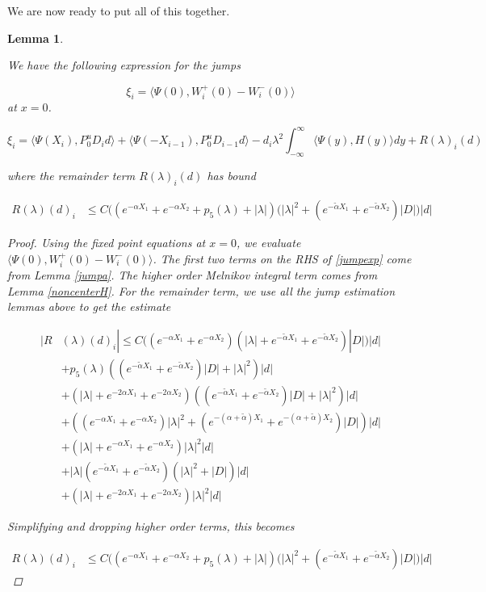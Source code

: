 \documentclass[12pt]{article}
\newtheorem{lemma}{Lemma}
\begin{document}
We are now ready to put all of this together.


\begin{lemma}\label{jump}

We have the following expression for the jumps 

\[
\xi_i = \langle \Psi(0), W_i^+(0) - W_i^-(0) \rangle
\]
at $x = 0$.

\begin{equation}\label{jumpexp}
\xi_i = \langle \Psi(X_i), P^u_0 D_i d \rangle + \langle \Psi(-X_{i-1}), P^u_0 D_{i-1} d \rangle - d_i \lambda^2 \int_{-\infty}^\infty \langle \Psi(y), H(y) \rangle dy + R(\lambda)_i(d)
\end{equation}

where the remainder term $R(\lambda)_i(d)$ has bound

\begin{align*}
R(\lambda)(d)_i &\leq C \Big( ( e^{-\alpha X_1} + e^{-\alpha X_2} + p_5(\lambda) + |\lambda| )(|\lambda|^2 + (e^{-\tilde{\alpha}X_1} + e^{-\tilde{\alpha}X_2}) |D|\Big) |d|
\end{align*}

\begin{proof}
Using the fixed point equations at $x = 0$, we evaluate $\langle \Psi(0), W_i^+(0) - W_i^-(0) \rangle$. The first two terms on the RHS of \eqref{jumpexp} come from Lemma \ref{jumpa}. The higher order Melnikov integral term comes from Lemma \ref{noncenterH}. For the remainder term, we use all the jump estimation lemmas above to get the estimate

\begin{align*}
|R&(\lambda)(d)_i| \leq C \Big( (e^{-\alpha X_1} + e^{-\alpha X_2})
( |\lambda| + e^{-\tilde{\alpha} X_1} + e^{-\tilde{\alpha} X_2}) |D| ) |d| \\
&+ p_5(\lambda) ( (e^{-\tilde{\alpha} X_1} + e^{-\tilde{\alpha} X_2}) |D| + |\lambda|^2 )|d| \\
&+ (|\lambda| + e^{-2 \alpha X_1} + e^{-2 \alpha X_2})( (e^{-\tilde{\alpha} X_1} + e^{-\tilde{\alpha} X_2}) |D| + |\lambda|^2 )|d| \\
&+ ( (e^{-\alpha X_1} + e^{-\alpha X_2}) |\lambda|^2 + (e^{-(\alpha + \tilde{\alpha}) X_1} + e^{-(\alpha + \tilde{\alpha}) X_2}) |D|) |d| \\
&+ ( |\lambda| + e^{-\alpha X_1} + e^{-\alpha X_2}) |\lambda|^2 |d| \\
&+ |\lambda| ( e^{-\tilde{\alpha} X_1} + e^{-\tilde{\alpha} X_2})(|\lambda|^2 + |D|) |d| \\
&+ (|\lambda| + e^{-2 \alpha X_1} + e^{-2 \alpha X_2} ) |\lambda|^2  |d|
\end{align*}

Simplifying and dropping higher order terms, this becomes

\begin{align*}
R(\lambda)(d)_i &\leq C \Big( ( e^{-\alpha X_1} + e^{-\alpha X_2} + p_5(\lambda) + |\lambda|  )(|\lambda|^2 + (e^{-\tilde{\alpha}X_1} + e^{-\tilde{\alpha}X_2}) |D|\Big) |d|
\end{align*}

\end{proof}
\end{lemma}
\end{document}
